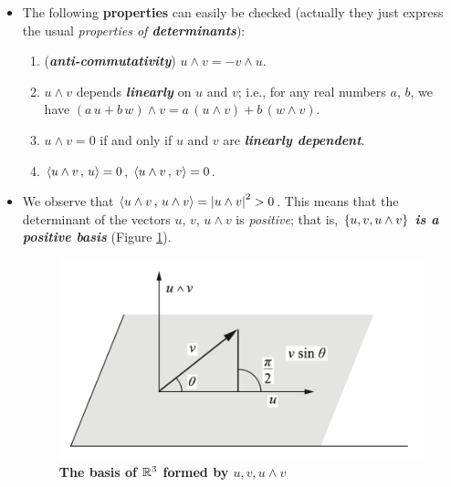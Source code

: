 \documentclass[11pt]{article}
\begin{document}
\begin{itemize}
\item The following \textbf{properties} can easily be checked (actually they just express
the usual \emph{properties of \textbf{determinants}}):
\begin{enumerate}
\item (\textbf{\emph{anti-commutativity}}) $u \wedge v = - v \wedge u$.
\item $u \wedge v$ depends \emph{\textbf{linearly}} on $u$ and $v$; i.e., for any real numbers $a$, $b$, we have
$(a\,u+b\,w) \wedge v = a\,(u \wedge v)+b\,(w \wedge v)$.
\item $u \wedge v = 0$ if and only if $u$ and $v$ are \emph{\textbf{linearly dependent}}.
\item $\left\langle u \wedge v\,,\, u \right\rangle = 0$, $\left\langle u \wedge v\,,\, v \right\rangle = 0$.
\end{enumerate}

\item We observe that $\left\langle u \wedge v\,,\, u \wedge v \right\rangle = \left\lvert u \wedge v \right\rvert^2 > 0$. This means that the determinant of the vectors $u$, $v$, $u \wedge v$ is \emph{positive}; that is, \emph{\textbf{$\left\{u, v, u \wedge v\right\}$ is a positive basis}} (Figure \ref{fig: cross_product_basis}).

\begin{figure}[tb]
\begin{minipage}{1\linewidth}
 \centerline{\includegraphics[scale = 0.5]{cross_product_basis.png}}
\end{minipage}
\caption{\scriptsize\textbf{The basis of ${\mathbb R}^3$ formed by $u, v, u \wedge v$ \citep{do1976differential}}}
\label{fig: cross_product_basis}
\end{figure}


\end{itemize}
\end{document}
